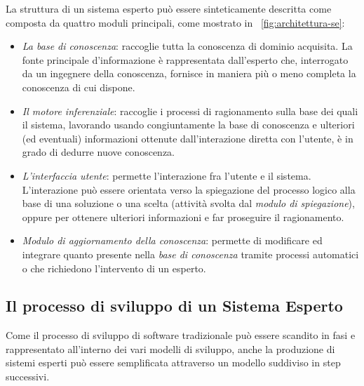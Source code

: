 La struttura di un sistema esperto può essere sinteticamente descritta come composta da quattro moduli principali, come mostrato in \figurename~\ref{fig:architettura-se}:
\begin{itemize}
	\item \emph{La base di conoscenza}: raccoglie tutta la conoscenza di dominio acquisita. La fonte principale d'informazione è rappresentata dall'esperto che, interrogato da un ingegnere della conoscenza, fornisce in maniera più o meno completa la conoscenza di cui dispone.
	\item \emph{Il motore inferenziale}: raccoglie i processi di ragionamento sulla base dei quali il sistema, lavorando usando congiuntamente la base di conoscenza e ulteriori (ed eventuali) informazioni ottenute dall'interazione diretta con l'utente, è in grado di dedurre nuove conoscenza.
	\item \emph{L'interfaccia utente}: permette l'interazione fra l'utente e il sistema. L'interazione può essere orientata verso la spiegazione del processo logico alla base di una soluzione o una scelta (attività svolta dal \emph{modulo di spiegazione}), oppure per ottenere ulteriori informazioni e far proseguire il ragionamento.
	\item \emph{Modulo di aggiornamento della conoscenza}: permette di modificare ed integrare quanto presente nella \emph{base di conoscenza} tramite processi automatici o che richiedono l'intervento di un esperto.
\end{itemize}

\subsection{Il processo di sviluppo di un Sistema Esperto}
Come il processo di sviluppo di software tradizionale può essere scandito in fasi e rappresentato all'interno dei vari modelli di sviluppo, anche la produzione di sistemi esperti può essere semplificata attraverso un modello suddiviso in step successivi. 

